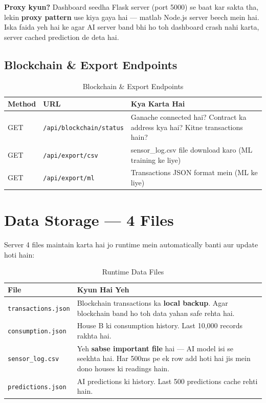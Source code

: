 \textbf{Proxy kyun?} Dashboard seedha Flask server (port 5000) se baat kar sakta tha, lekin \textbf{proxy pattern} use kiya gaya hai --- matlab Node.js server beech mein hai. Iska faida yeh hai ke agar AI server band bhi ho toh dashboard crash nahi karta, server cached prediction de deta hai.

\subsection{Blockchain \& Export Endpoints}

\begin{table}[H]
\centering
\begin{tabularx}{\textwidth}{l l X}
\toprule
\textbf{Method} & \textbf{URL} & \textbf{Kya Karta Hai} \\
\midrule
GET & \texttt{/api/blockchain/status} & Ganache connected hai? Contract ka address kya hai? Kitne transactions hain? \\
GET & \texttt{/api/export/csv} & sensor\_log.csv file download karo (ML training ke liye) \\
GET & \texttt{/api/export/ml} & Transactions JSON format mein (ML ke liye) \\
\bottomrule
\end{tabularx}
\caption{Blockchain \& Export Endpoints}
\end{table}

\section{Data Storage --- 4 Files}

Server 4 files maintain karta hai jo runtime mein automatically banti aur update hoti hain:

\begin{table}[H]
\centering
\begin{tabularx}{\textwidth}{l X}
\toprule
\textbf{File} & \textbf{Kyun Hai Yeh} \\
\midrule
\texttt{transactions.json} & Blockchain transactions ka \textbf{local backup}. Agar blockchain band ho toh data yahan safe rehta hai. \\
\texttt{consumption.json} & House B ki consumption history. Last 10,000 records rakhta hai. \\
\texttt{sensor\_log.csv} & Yeh \textbf{sabse important file} hai --- AI model isi se seekhta hai. Har 500ms pe ek row add hoti hai jis mein dono houses ki readings hain. \\
\texttt{predictions.json} & AI predictions ki history. Last 500 predictions cache rehti hain. \\
\bottomrule
\end{tabularx}
\caption{Runtime Data Files}
\end{table}

